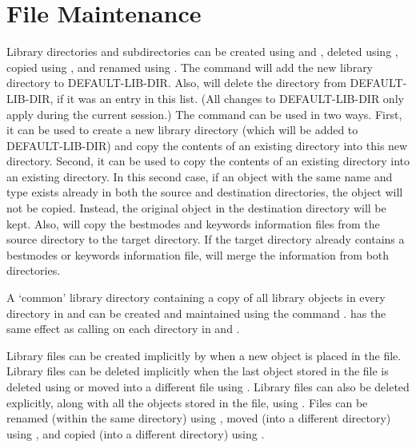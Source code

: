 \section{File Maintenance}
Library directories and subdirectories can be created using  and
, deleted using
, copied using , and
renamed using .  The command 
will add the new library directory to DEFAULT-LIB-DIR.
Also, 
will delete the directory from DEFAULT-LIB-DIR, if it was an entry in this list.
(All changes to DEFAULT-LIB-DIR only apply during the current {\TPS} session.)
The command  can be used in two ways.  First, it can
be used to create a new library directory (which will be added to DEFAULT-LIB-DIR)
and copy the contents of an existing directory into this new directory.  Second,
it can be used to copy the contents of an existing directory into an existing directory.
In this second case, if an object with the same name and type exists already in both
the source and destination directories, the object will not be copied.  Instead, the
original object in the destination directory will be kept.  Also,
 will copy the bestmodes and keywords information files
from the source directory to the target directory.  If the target directory
already contains a bestmodes or keywords information file, 
will merge the information from both directories.

A `common' library directory containing a copy of all library objects
in every directory in  and 
can be created and maintained using the command .
 has the same effect as calling 
on each directory in  and .

Library files can be created implicitly by  when a new object is placed in
the file.  Library files can be deleted implicitly when the last object stored in
the file is deleted using  or moved into a different file
using .  Library files can also be deleted explicitly, along
with all the objects stored in the file, using .  Files
can be renamed (within the same directory) using ,
moved (into a different directory) using , and
copied (into a different directory) using .

